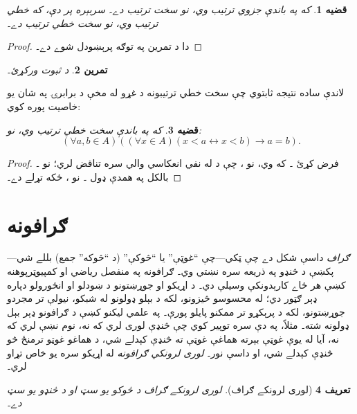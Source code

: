 \documentclass[12pt,a4paper,oneside]{report}
\newcommand{\tuple}[1]{\langle #1\rangle}
\newcommand{\lif}{\mathbin{\rightarrow}}
\newcommand{\liff}{\mathbin{\leftrightarrow}}
\newcommand{\Id}[1]{\mathord{\mathrm{Id}_{#1}}}
\newcommand{\olfileid}[3]{\gdef\pspart{#1}\gdef\pschapter{#2}\gdef\pssection{#3}}
\newcommand{\olsection}[1]{\section{#1}\label{\pspart:\pschapter:\pssection:sec}}
\newcommand{\ollabel}[1]{\label{\pspart:\pschapter:\pssection:#1}}
\newtheorem{defn}{تعريف}[section]
\newtheorem{prop}[defn]{قضيه}
\newtheorem{prob}[defn]{تمرين}
\begin{document}
\begin{prop}\ollabel{prop:partialtostrict}
که  په  باندې جزوي ترتيب وي، نو
\LR{$R^- = R \setminus \Id{A}$} سخت ترتيب دے۔ سربېره پر دې، که 
خطي ترتيب وي، نو  سخت خطي ترتيب دے۔
\end{prop}

\begin{proof}
دا د تمرين په توګه پرېښودل شوے دے۔
\end{proof}

\begin{prob}
د  ثبوت ورکړئ۔
\end{prob}

لاندې ساده نتيجه ثابتوي چې سخت خطي ترتيبونه د غړو له مخې د
برابرۍ په شان يو خاصيت پوره کوي:

\begin{prop}\ollabel{prop:extensionality-strictlinearorders}
که \LR{$<$} په  باندې سخت خطي ترتيب وي، نو:
\[
  (\forall a, b \in A)((\forall x \in A)(x < a \liff x < b) \lif a = b).
\]
\end{prop}

\begin{proof}
فرض کړئ \LR{$(\forall x \in A)(x < a \liff x < b)$}۔ که  وي،
نو ، چې د \LR{$<$} له نفي انعکاسي والي سره تناقض لري؛ نو
۔ بالکل په همدې ډول ۔ نو ، ځکه
\LR{$<$} تړلے دے۔
\end{proof}




\olfileid{sfr}{rel}{grp}
\olsection{ګرافونه}

\emph{ګراف} داسې شکل دے چې ټکي—چې ``غوټې'' يا ``څوکې'' (د
``څوکه'' جمع) بللے شي—پکښې د څنډو په ذريعه سره نښتي وي۔ ګرافونه
په منفصل رياضي او کمپيوټرپوهنه کښې هر ځاے کارېدونکې وسيلې دي۔
د اړيکو او جوړښتونو د ښودلو او انځورولو دپاره ډېر ګټور دي؛ له
محسوسو څيزونو، لکه د بېلو ډولونو له شبکو، نيولې تر مجردو جوړښتونو،
لکه د پرېکړو تر ممکنو پايلو پورې۔ په علمي ليکنو کښې د ګرافونو ډېر
بېل ډولونه شته۔ مثلاً، په دې سره توپير کوي چې څنډې لوری لري که نه،
نوم نښې لري که نه، آيا له يوې غوټې بېرته هماغې غوټې ته څنډې کېدلے
شي، د هماغو غوټو ترمنځ څو څنډې کېدلے شي، او داسې نور۔
\emph{لوری لرونکي ګرافونه} له اړيکو سره يو خاص تړاو لري۔

\begin{defn}[لوری لرونکے ګراف]
\emph{لوری لرونکے ګراف} \LR{$G = \tuple{V, E}$} د \emph{څوکو} يو سټ
 او د \emph{څنډو} يو سټ  دے۔
\end{defn}
\end{document}
